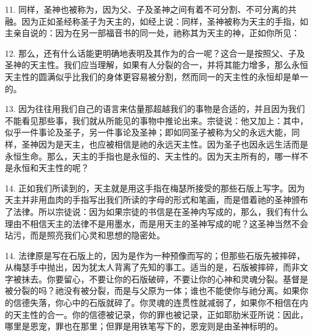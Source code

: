 11. 同样，圣神也被称为，因为父、子及圣神之间有着不可分割、不可分离的共融。因为正如圣经称圣子为天主的，如经上说：同样，圣神被称为天主的手指，如主亲自说的：因为在另一部福音书的同一处，祂称其为天主的神，正如你所见：\par

12. 那么，还有什么话能更明确地表明及其作为的合一呢？这合一是按照父、子及圣神的天主性。我们应当理解，如果有人分裂的合一，并将其能力增多，那么永恒天主性的圆满似乎比我们的身体更容易被分割，然而同一的天主性的永恒却是单一的。\par

13. 因为往往用我们自己的语言来估量那超越我们的事物是合适的，并且因为我们不能看见那些事，我们就从所能见的事物中推论出来。宗徒说：他又加上：其中，似乎一件事论及圣子，另一件事论及圣神；即如同圣子被称为父的永远大能，同样，圣神因为是天主，也应被相信是祂的永远天主性。因为圣子也因永远生活而是永恒生命。那么，天主的手指也是永恒的、天主性的。因为天主所有的，哪一样不是永恒和天主性的呢？\par

14. 正如我们所读到的，天主就是用这手指在梅瑟所接受的那些石版上写字。因为天主并非用血肉的手指写出我们所读的字母的形式和笔画，而是借着祂的圣神颁布了法律。所以宗徒说：因为如果宗徒的书信是在圣神内写成的，那么，我们有什么理由不相信天主的法律不是用墨水，而是用天主的圣神写成的呢？这圣神当然不会玷污，而是照亮我们心灵和思想的隐密处。\par

14. 法律原是写在石版上的，因为是作为一种预像而写的；但那些石版先被摔碎，从梅瑟手中抛出，因为犹太人背离了先知的事工。适当的是，石版被摔碎，而非文字被抹去。你要留心，不要让你的石版破碎，不要让你的心神和灵魂分裂。基督是被分裂的吗？祂没有被分裂，而是与父原为一体；谁也不能使你与祂分离。如果你的信德失落，你心中的石版就碎了。你灵魂的连贯性就减弱了，如果你不相信在内的天主性的合一。你的信德被记录，你的罪也被记录，正如耶肋米亚所说：因此，哪里是恩宠，罪也在那里；但罪是用铁笔写下的，恩宠则是由圣神标明的。\par

